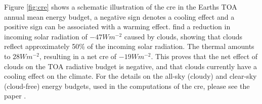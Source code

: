 

Figure \ref{fig:cre} shows a schematic illustration of the \acrshort{cre} in the Earths TOA annual mean energy budget, a negative sign denotes a cooling effect and a positive sign can be associated with a warming effect. %
 find a reduction in incoming solar radiation of $-47Wm^{-2}$ caused by clouds, showing that clouds reflect approximately 50\% of the incoming solar radiation. The thermal  amounts to $28Wm^{-2}$, resulting in a net \acrshort{cre} of $-19Wm^{-2}$. This proves that the net effect of clouds on the TOA radiative budget is negative, and that clouds currently have a cooling effect on the climate. For the details on the all-sky (cloudy) and clear-sky (cloud-free) energy budgets, used in the computations of the \acrshort{cre}, please see the paper . %



